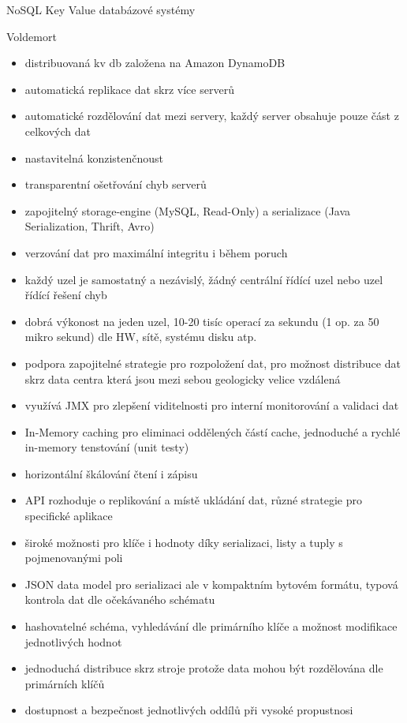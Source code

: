 \documentclass{article}
\begin{document}
\begin{section}{NoSQL Key Value databázové systémy}
		\begin{subsection}{Voldemort}
			\begin{itemize}
				\item distribuovaná kv db založena na Amazon DynamoDB
				\item automatická replikace dat skrz více serverů
				\item automatické rozdělování dat mezi servery, každý server obsahuje pouze část z celkových dat
				\item nastavitelná konzistenčnoust
				\item transparentní ošetřování chyb serverů
				\item zapojitelný storage-engine (MySQL, Read-Only) a serializace (Java Serialization, Thrift, Avro) 
				\item verzování dat pro maximální integritu i během poruch
				\item každý uzel je samostatný a nezávislý, žádný centrální řídící uzel nebo uzel řídící řešení chyb
				\item dobrá výkonost na jeden uzel, 10-20 tisíc operací za sekundu (1 op. za 50 mikro sekund) dle HW, sítě, systému disku atp.
				\item podpora zapojitelné strategie pro rozpoložení dat, pro možnost distribuce dat skrz data centra která jsou mezi sebou geologicky velice vzdálená
				\item využívá JMX pro zlepšení viditelnosti pro interní monitorování a validaci dat
				\item In-Memory caching pro eliminaci oddělených částí cache, jednoduché a rychlé in-memory tenstování (unit testy)
				\item horizontální škálování čtení i zápisu
				\item API rozhoduje o replikování a místě ukládání dat, různé strategie pro specifické aplikace
				\item široké možnosti pro klíče i hodnoty díky serializaci, listy a tuply s pojmenovanými poli
				\item JSON data model pro serializaci ale v kompaktním bytovém formátu, typová kontrola dat dle očekávaného schématu
				\item hashovatelné schéma, vyhledávání dle primárního klíče a možnost modifikace jednotlivých hodnot
				\item jednoduchá distribuce skrz stroje protože data mohou být rozdělována dle primárních klíčů
				\item dostupnost a bezpečnost jednotlivých oddílů při vysoké propustnosi
			\end{itemize}
		\end{subsection}
	\end{section}
\end{document}
